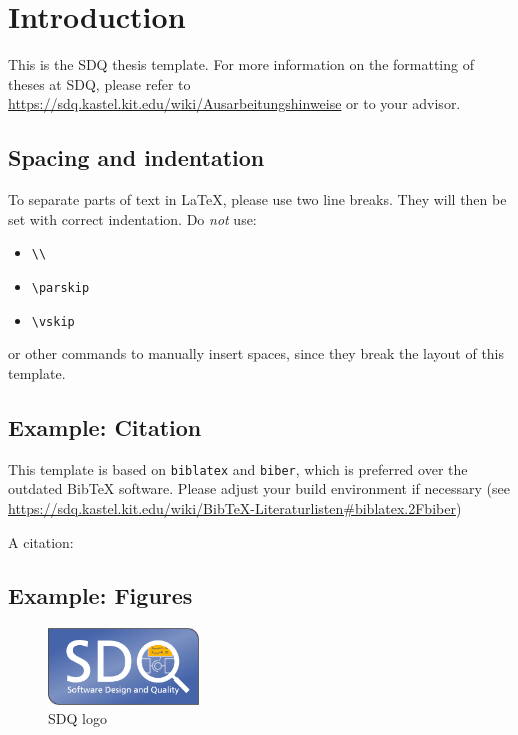 
\chapter{Introduction}
\label{ch:Introduction}


This is the SDQ thesis template.
For more information on the formatting of theses at SDQ, please refer to
\url{https://sdq.kastel.kit.edu/wiki/Ausarbeitungshinweise} or to your advisor.

\section{Spacing and indentation}
To separate parts of text in \LaTeX, please use two line breaks.
They will then be set with correct indentation.
Do \emph{not} use:
\begin{itemize}
  \itemsep0em
  \item \texttt{\textbackslash\textbackslash}
  \item \texttt{\textbackslash parskip}
  \item \texttt{\textbackslash vskip}
\end{itemize} 
or other commands to manually insert spaces, since they break the layout of this template.

\section{Example: Citation}
\label{sec:Introduction:Citation}
This template is based on \texttt{biblatex} and \texttt{biber}, which is preferred over the
outdated Bib\TeX{} software.
Please adjust your build environment if necessary (see
\url{https://sdq.kastel.kit.edu/wiki/BibTeX-Literaturlisten#biblatex.2Fbiber})

A citation: \cite{becker2008a} 

\section{Example: Figures}
\label{sec:Introduction:Figures}
\begin{figure}
\centering
\includegraphics[width=4cm]{logos/sdqlogo}
\caption{SDQ logo}
\label{fig:sdqlogo}
\end{figure}

